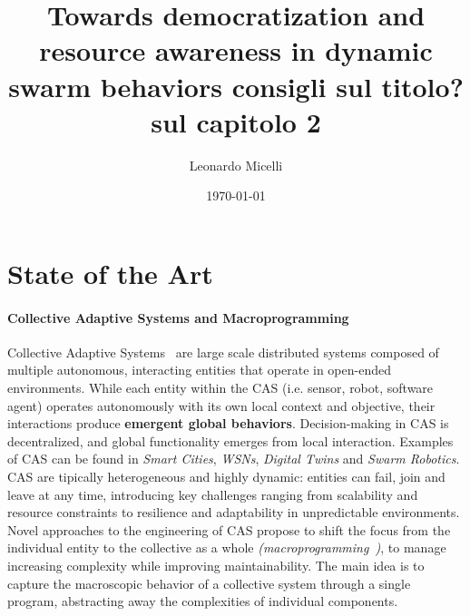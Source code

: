 \documentclass[12pt]{article}
\begin{document}
\title{Towards democratization and resource awareness in dynamic swarm behaviors consigli sul titolo? sul capitolo 2}
\author{Leonardo Micelli}
\date{\today}
\maketitle

\noindent


\newpage
\setcounter{tocdepth}{2}

\setlength{\parindent}{0em}
\setlength{\parskip}{1em}

\section{State of the Art}
\paragraph{\textbf{Collective Adaptive Systems and Macroprogramming}} Collective Adaptive Systems~\cite{ferscha2015collective} are large scale distributed systems composed of multiple autonomous, 
interacting entities that operate in open-ended environments. While each entity within the CAS (i.e. sensor, robot, software agent) operates autonomously with its own local context and objective, their interactions
produce \textbf{emergent global behaviors}. Decision-making in CAS is decentralized, and global functionality emerges from local interaction. Examples of CAS can be found in \textit{Smart Cities}, \textit{WSNs}, \textit{Digital Twins} and \textit{Swarm Robotics}.
CAS are tipically heterogeneous and highly dynamic: entities can fail, join and leave at any time, introducing key challenges ranging from scalability and resource constraints to resilience and adaptability in
unpredictable environments. Novel approaches to the engineering of CAS propose to shift the focus from the individual entity to the collective as a whole \textit{(macroprogramming~\cite{10.1145/3579353})}, to manage increasing complexity while
improving maintainability. The main idea is to capture the macroscopic behavior of a collective system through a single program, abstracting away the complexities of individual components.
\end{document}
